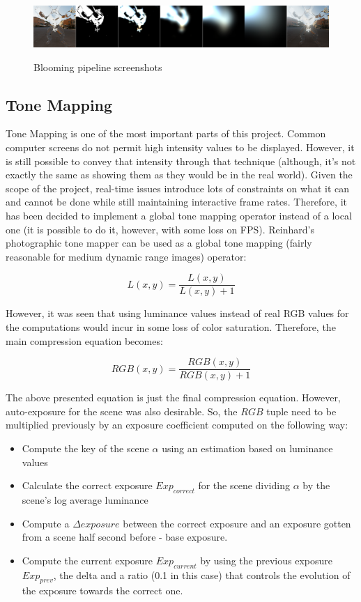 \documentclass[twocolumn,8pt]{article}
\begin{document}
\begin{figure}[t]
\centering
{\includegraphics[scale=0.25]{./pics/bloomPipelinePics.png}} 
\caption{Blooming pipeline screenshots}
\label{fig:bloomPipelinePics}
\end{figure}

\subsection{Tone Mapping}
Tone Mapping is one of the most important parts of this project. Common computer screens do not permit high intensity values to be displayed. However, it is still possible to convey that intensity through that technique (although, it's not exactly the same as showing them as they would be in the real world). Given the scope of the project, real-time issues introduce lots of constraints on what it can and cannot be done while still maintaining interactive frame rates. Therefore, it has been decided to implement a global tone mapping operator instead of a local one (it is possible to do it, however, with some loss on FPS). Reinhard's photographic tone mapper \cite{reinhardPhoto} can be used as a global tone mapping (fairly reasonable for medium dynamic range images) operator:

\begin{equation}
L(x,y) = \frac{L(x,y)}{L(x,y) + 1}
\end{equation} 

However, it was seen that using luminance values instead of real RGB values for the computations would incur in some loss of color saturation. Therefore, the main compression equation becomes:

\begin{equation}
RGB(x,y) = \frac{RGB(x,y)}{RGB(x,y) + 1}
\end{equation} 

The above presented equation is just the final compression equation. However, auto-exposure for the scene was also desirable. So, the $RGB$ tuple need to be multiplied previously by an exposure coefficient computed on the following way:

\begin{itemize}
\item Compute the key of the scene $\alpha$ using an estimation based on luminance values \cite{reinhardParamEstimation}
\item Calculate the correct exposure $Exp_{correct}$ for the scene dividing $\alpha$ by the scene's log average luminance
\item Compute a $\Delta exposure$ between the correct exposure and an exposure gotten from a scene half second before - base exposure.
\item Compute the current exposure $Exp_{current}$ by using the previous exposure $Exp_{prev}$, the delta and a ratio (0.1 in this case) that controls the evolution of the exposure towards the correct one.
\end{itemize}
\end{document}
